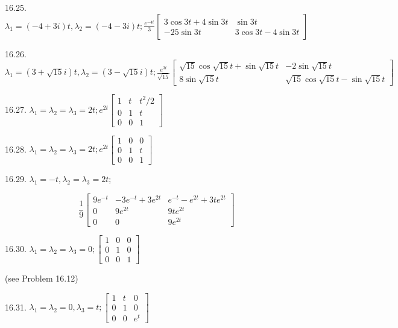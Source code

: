 \documentclass[10pt]{article}
\begin{document}
16.25. $\lambda_{1}=(-4+3 i) t, \lambda_{2}=(-4-3 i) t ; \frac{e^{-4 t}}{3}\left[\begin{array}{cc}3 \cos 3 t+4 \sin 3 t & \sin 3 t \\ -25 \sin 3 t & 3 \cos 3 t-4 \sin 3 t\end{array}\right]$

16.26. $\lambda_{1}=(3+\sqrt{15} i) t, \lambda_{2}=(3-\sqrt{15} i) t ; \frac{e^{3 t}}{\sqrt{15}}\left[\begin{array}{cc}\sqrt{15} \cos \sqrt{15} t+\sin \sqrt{15} t & -2 \sin \sqrt{15} t \\ 8 \sin \sqrt{15} t & \sqrt{15} \cos \sqrt{15} t-\sin \sqrt{15} t\end{array}\right]$

16.27. $\lambda_{1}=\lambda_{2}=\lambda_{3}=2 t ; e^{2 t}\left[\begin{array}{ccc}1 & t & t^{2} / 2 \\ 0 & 1 & t \\ 0 & 0 & 1\end{array}\right]$

16.28. $\lambda_{1}=\lambda_{2}=\lambda_{3}=2 t ; e^{2 t}\left[\begin{array}{ccc}1 & 0 & 0 \\ 0 & 1 & t \\ 0 & 0 & 1\end{array}\right]$

16.29. $\lambda_{1}=-t, \lambda_{2}=\lambda_{3}=2 t$;

$$
\frac{1}{9}\left[\begin{array}{ccc}
9 e^{-t} & -3 e^{-t}+3 e^{2 t} & e^{-t}-e^{2 t}+3 t e^{2 t} \\
0 & 9 e^{2 t} & 9 t e^{2 t} \\
0 & 0 & 9 e^{2 t}
\end{array}\right]
$$

16.30. $\lambda_{1}=\lambda_{2}=\lambda_{3}=0 ;\left[\begin{array}{ccc}1 & 0 & 0 \\ 0 & 1 & 0 \\ 0 & 0 & 1\end{array}\right]$

(see Problem 16.12)

16.31. $\lambda_{1}=\lambda_{2}=0, \lambda_{3}=t ;\left[\begin{array}{ccc}1 & t & 0 \\ 0 & 1 & 0 \\ 0 & 0 & e^{t}\end{array}\right]$
\end{document}
